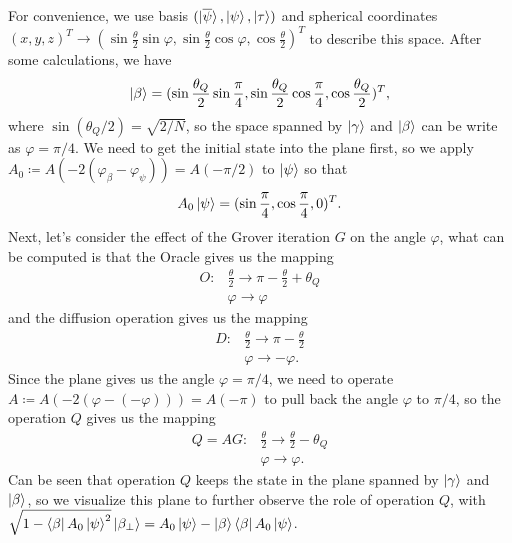 \documentclass[a4paper,10pt]{book}
\numberwithin{equation}{section}
\begin{document}
For convenience, we use basis $(\ket{\overline{\psi}},\ket{\psi},\ket{\tau})$ and spherical coordinates $(x,y,z)^{T}\to(\sin\frac{\theta}{2}\sin\varphi,\sin\frac{\theta}{2}\cos\varphi,\cos\frac{\theta}{2})^{T}$ to describe this space. After some calculations, we have
\begin{equation}
    \ket{\beta}=(\sin\frac{\theta_{Q}}{2}\sin\frac{\pi}{4},\sin\frac{\theta_{Q}}{2}\cos\frac{\pi}{4},\cos\frac{\theta_{Q}}{2})^{T},
\end{equation}
where $\sin(\theta_{Q}/2)=\sqrt{2/N}$, so the space spanned by $\ket{\gamma}$ and $\ket{\beta}$ can be write as $\varphi=\pi/4$. We need to get the initial state into the plane first, so we apply $A_{0}\coloneqq A(-2(\varphi_{\beta}-\varphi_{\psi}))=A(-\pi/2)$ to $\ket{\psi}$ so that
\begin{equation}
    A_{0}\ket{\psi}=(\sin\frac{\pi}{4},\cos\frac{\pi}{4},0)^{T}.
\end{equation}
Next, let's consider the effect of the Grover iteration $G$ on the angle $\varphi$, what can be computed is that the Oracle gives us the mapping
\begin{equation}
    \begin{split}
        O\colon & \frac{\theta}{2}\to\pi-\frac{\theta}{2}+\theta_{Q} \\
                & \varphi\to\varphi
    \end{split}
\end{equation}
and the diffusion operation gives us the mapping
\begin{equation}
    \begin{split}
        D\colon & \frac{\theta}{2}\to\pi-\frac{\theta}{2} \\
                & \varphi\to-\varphi.
    \end{split}
\end{equation}
Since the plane gives us the angle $\varphi=\pi/4$, we need to operate $A\coloneqq A(-2(\varphi-(-\varphi)))=A(-\pi)$ to pull back the angle $\varphi$ to $\pi/4$, so the operation $Q$ gives us the mapping
\begin{equation}
    \begin{split}
        Q=AG\colon & \frac{\theta}{2}\to\frac{\theta}{2}-\theta_{Q} \\
                   & \varphi\to\varphi.
    \end{split}
\end{equation}
Can be seen that operation $Q$ keeps the state in the plane spanned by $\ket{\gamma}$ and $\ket{\beta}$, so we visualize this plane to further observe the role of operation $Q$, with $\sqrt{1-\bra{\beta}A_{0}\ket{\psi}^{2}}\ket{\beta_{\perp}}=A_{0}\ket{\psi}-\ket{\beta}\bra{\beta}A_{0}\ket{\psi}$.
\end{document}
